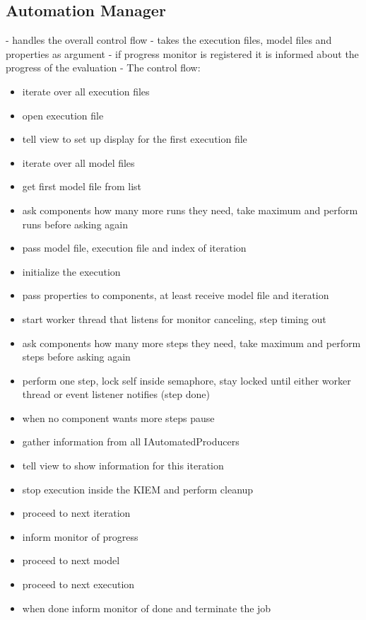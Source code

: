 \subsection{Automation Manager}
- handles the overall control flow
- takes the execution files, model files and properties as argument
- if progress monitor is registered it is informed about the progress of the evaluation
- The control flow:
\begin{itemize}
 \item iterate over all execution files
 \item open execution file
 \item tell view to set up display for the first execution file
 \item iterate over all model files
 \item get first model file from list
 \item ask components how many more runs they need, take maximum and perform runs before asking again
 \item pass model file, execution file and index of iteration
 \item initialize the execution
 \item pass properties to components, at least receive model file and iteration
 \item start worker thread that listens for monitor canceling, step timing out
 \item ask components how many more steps they need, take maximum and perform steps before asking again
 \item perform one step, lock self inside semaphore, stay locked until either worker thread or event listener notifies (step done)
 \item when no component wants more steps pause
 \item gather information from all IAutomatedProducers
 \item tell view to show information for this iteration
 \item stop execution inside the KIEM and perform cleanup
 \item proceed to next iteration
 \item inform monitor of progress
 \item proceed to next model
 \item proceed to next execution
 \item when done inform monitor of done and terminate the job
\end{itemize}



